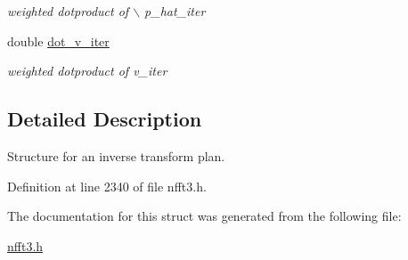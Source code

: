 \begin{CompactItemize}
\begin{CompactList}\small\item\em weighted dotproduct of $\backslash$ p\_\-hat\_\-iter \item\end{CompactList}\item 
\hypertarget{structinnfft__plan_o17}{
double \hyperlink{structinnfft__plan_o17}{dot\_\-v\_\-iter}}
\label{structinnfft__plan_o17}

\begin{CompactList}\small\item\em weighted dotproduct of v\_\-iter \item\end{CompactList}\end{CompactItemize}


\subsection{Detailed Description}
Structure for an inverse transform plan. 



Definition at line 2340 of file nfft3.h.

The documentation for this struct was generated from the following file:\begin{CompactItemize}
\item 
\hyperlink{nfft3_8h}{nfft3.h}\end{CompactItemize}
